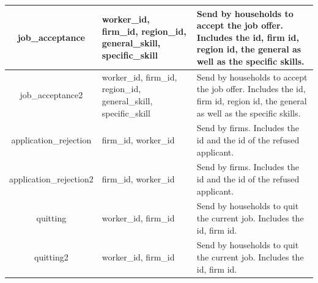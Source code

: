 \begin{table}[!htb]
\begin{center}
\begin{tabular}{|c|l|l|}
job\_acceptance & {\parbox[l]{5cm}{worker\_id, firm\_id, region\_id,
general\_skill, specific\_skill}} & {\parbox[l]{5cm}{Send by
households to accept the job offer. Includes the id, firm id, region
id, the general
as well as the specific skills.}}   \\
\hline



job\_acceptance2 & {\parbox[l]{5cm}{worker\_id, firm\_id,
region\_id, general\_skill, specific\_skill}} &
{\parbox[l]{5cm}{Send by households to accept the job offer.
Includes the id, firm id, region id, the general
as well as the specific skills.}}   \\
\hline

application\_rejection & {\parbox[l]{5cm}{firm\_id, worker\_id}} &
{\parbox[l]{5cm}{Send by firms. Includes the id and the id of the refused applicant.}}   \\
\hline

application\_rejection2 & {\parbox[l]{5cm}{firm\_id, worker\_id}} &
{\parbox[l]{5cm}{Send by firms. Includes the id and the id of the refused applicant.}}   \\
\hline

quitting & {\parbox[l]{5cm}{worker\_id, firm\_id}} &
{\parbox[l]{5cm}{Send by households to quit the current job. Includes the id, firm id.}}   \\
\hline

quitting2 & {\parbox[l]{5cm}{worker\_id, firm\_id}} &
{\parbox[l]{5cm}{Send by households to quit the current job. Includes the id, firm id.}}   \\
\hline

\end{tabular}\end{center}\label{tab:labourmarketmsg}
\end{table}


